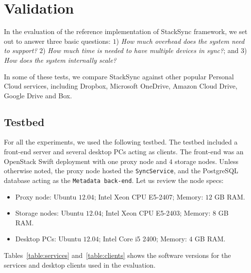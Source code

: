 \chapter{Validation}

In the evaluation of the reference implementation of StackSync framework, we set out to answer three basic questions: 
$1$) \textit{How much overhead does the system need to support?} $2$) \textit{How much time is needed to have multiple devices in sync?}; and 
$3$) \textit{How does the system internally scale?}

In some of these tests, we compare StackSync against other popular Personal Cloud services, including Dropbox, Microsoft OneDrive, Amazon Cloud Drive, Google Drive and Box.

\section{Testbed}

For all the experiments, we used the following testbed. The testbed included a front-end server and several desktop 
PCs acting as clients. The front-end was an OpenStack Swift deployment with one proxy node and $4$ storage nodes.  
Unless otherwise noted, the proxy node hosted the \texttt{SyncService}, and the PostgreSQL database acting as the \texttt{Metadata back-end}. Let us review the node specs:
\begin{itemize}
\item Proxy node: Ubuntu $12.04$; Intel Xeon CPU E5-2407; Memory: $12$ GB RAM.
\item Storage nodes: Ubuntu $12.04$;  Intel Xeon CPU E5-2403; Memory: $8$ GB RAM.
\item Desktop PCs: Ubuntu $12.04$; Intel Core i5 2400; Memory: $4$ GB RAM.
\end{itemize}

Tables~\ref{table:services} and~\ref{table:clients} shows the software versions for the services and desktop clients used in the evaluation.

